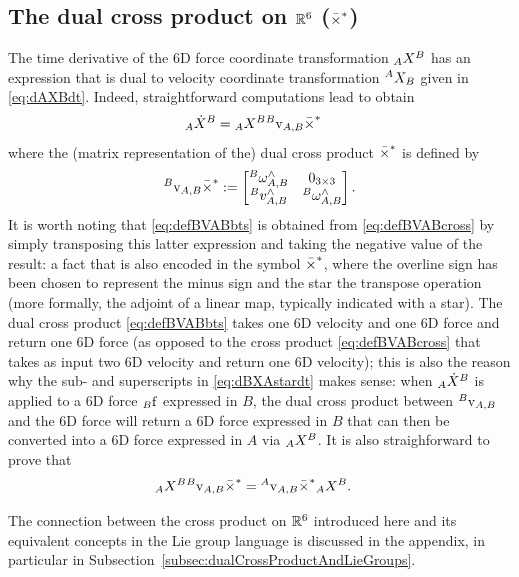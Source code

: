 \subsection{The dual cross product on $\mathbb{R}^6$ (${\bar\times^*}$)}

The time derivative of the 6D force coordinate transformation $\hspace{0em}_A X^B$ has an expression that is dual to velocity coordinate transformation $\hspace{0em}^AX_B$ given in \eqref{eq:dAXBdt}. Indeed, straightforward computations lead to obtain
\begin{align}\label{eq:dBXAstardt}
  \hspace{0em}_A{\dot X}^B 
  & = 
  \hspace{0em}_A X^B \hspace{0em}^B {\rm v}_{A,B} {\bar\times^*} 
\end{align}
where the (matrix representation of the) dual cross product ${\bar\times^*}$ is defined by 
\begin{align} \label{eq:defBVABbts}
\hspace{0em}^B{\rm v}_{A,B} \bar\times^* :=
\begin{bmatrix}
\hspace{0em}^B\omega_{A,B}^\wedge & 
0_{3 \times 3} \\
\hspace{0em}^Bv_{A,B}^\wedge & 
\hspace{0em}^B\omega_{A,B}^\wedge
\end{bmatrix}.
\end{align}
It is worth noting that \eqref{eq:defBVABbts}
is obtained from \eqref{eq:defBVABcross} by simply transposing this latter expression and taking the negative value of the result: a fact that is also encoded in the symbol ${\bar\times^*}$, where 
the overline sign has been chosen to represent the minus sign and the star the transpose operation (more formally, the adjoint of a linear map, typically indicated with a star). 
The dual cross product \eqref{eq:defBVABbts}
takes one 6D velocity and one 6D force and return one 6D force (as opposed to the cross product \eqref{eq:defBVABcross} that takes as input two 6D velocity and return one 6D velocity); this is also the reason why the sub- and superscripts in  \eqref{eq:dBXAstardt} makes sense:
when $\hspace{0em}_A{\dot X}^B$ is applied to a 
6D force $\hspace{0em}_B{\rm f}$ expressed in $B$, the dual cross product between $\hspace{0em}^B {\rm v}_{A,B}$ and the 6D force will return a 6D force expressed in $B$ that can then be converted into a 6D force expressed in $A$ via $\hspace{0em}_AX^B$. It is also straighforward to prove that
\begin{align}
\hspace{0em}_A X^B \hspace{0em}^B {\rm v}_{A,B} {\bar\times^*} 
& = 
\hspace{0em}^A {\rm v}_{A,B} {\bar\times^*} \hspace{0em}_A X^B .
\end{align}

\begin{remark}
The connection between the cross product on $\mathbb{R}^6$ introduced here and its equivalent concepts in the Lie group language is discussed in the appendix, in particular in Subsection~\ref{subsec:dualCrossProductAndLieGroups}.
\end{remark}


